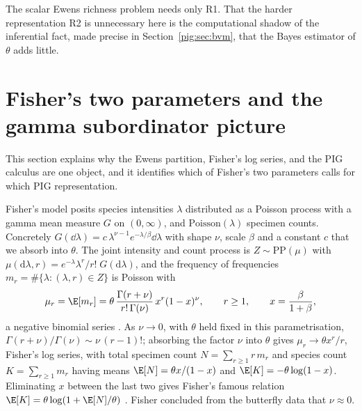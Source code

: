 \begin{remark}\label{pig:rem:r1}
The scalar Ewens richness problem needs only R1. That the harder representation R2 is unnecessary here is the computational shadow of the inferential fact, made precise in Section~\ref{pig:sec:bvm}, that the Bayes estimator of $\theta$ adds little.
\end{remark}

\section{Fisher's two parameters and the gamma subordinator picture}\label{pig:sec:fisher}

This section explains why the Ewens partition, Fisher's log series, and the PIG calculus are one object, and it identifies which of Fisher's two parameters calls for which PIG representation.

Fisher's model posits species intensities $\lambda$ distributed as a Poisson process with a gamma mean measure $G$ on $(0,\infty)$, and $\mathrm{Poisson}(\lambda)$ specimen counts. Concretely $G(\dd\lambda)=c\,\lambda^{\nu-1}e^{-\lambda/\beta}\dd\lambda$ with shape $\nu$, scale $\beta$ and a constant $c$ that we absorb into $\theta$. The joint intensity and count process is $Z\sim\mathrm{PP}(\mu)$ with $\mu(\mathrm{d}\lambda,r)=e^{-\lambda}\lambda^r/r!\;G(\mathrm{d}\lambda)$, and the frequency of frequencies $m_r=\#\{\lambda:(\lambda,r)\in Z\}$ is Poisson with
\begin{equation}\label{pig:eq:nbseries}
\mu_r=\E[m_r]=\theta\,\frac{\Gamma(r+\nu)}{r!\,\Gamma(\nu)}\,x^r(1-x)^{\nu},\qquad r\ge1,\qquad x=\frac{\beta}{1+\beta},
\end{equation}
a negative binomial series \citep{pig:mccullagh2016}. As $\nu\to0$, with $\theta$ held fixed in this parametrisation, $\Gamma(r+\nu)/\Gamma(\nu)\sim\nu\,(r-1)!$; absorbing the factor $\nu$ into $\theta$ gives $\mu_r\to\theta x^r/r$, Fisher's log series, with total specimen count $N=\sum_{r\ge1}r\,m_r$ and species count $K=\sum_{r\ge1}m_r$ having means $\E[N]=\theta x/(1-x)$ and $\E[K]=-\theta\log(1-x)$. Eliminating $x$ between the last two gives Fisher's famous relation $\E[K]=\theta\log(1+\E[N]/\theta)$ \citep{pig:fisher1943}. Fisher concluded from the butterfly data that $\nu\approx0$.

